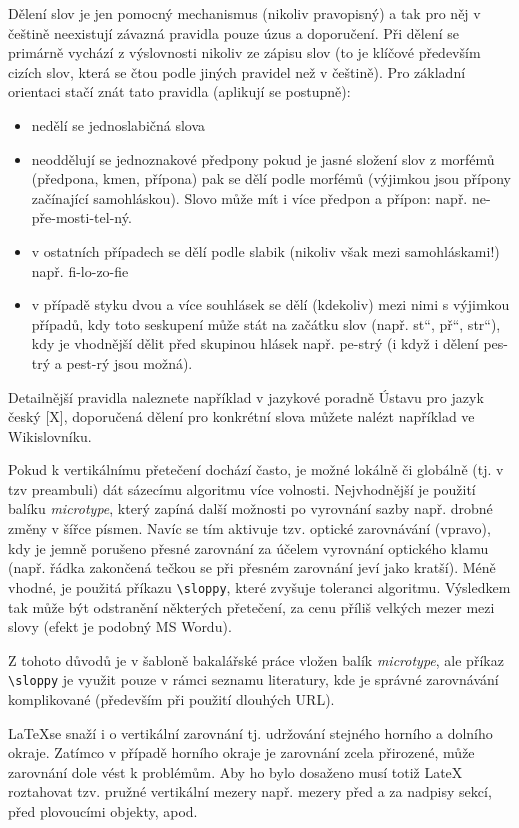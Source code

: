 \documentclass[male,czech,api_bc]{kitheses}
\newcommand{\UV}[1]{\quotedblbase#1\textquotedblleft}
\begin{document}
Dělení slov je jen pomocný mechanismus (nikoliv pravopisný) a tak pro něj v češtině neexistují závazná pravidla pouze úzus a doporučení. Při dělení se primárně vychází z výslovnosti nikoliv ze zápisu slov (to je klíčové především cizích slov, která se čtou podle jiných pravidel než v češtině). Pro základní orientaci stačí znát tato pravidla (aplikují se postupně):

\begin{itemize}
\item nedělí se jednoslabičná slova
\item neoddělují se jednoznakové předpony
pokud je jasné složení slov z morfémů (předpona, kmen, přípona) pak se dělí podle morfémů (výjimkou jsou přípony začínající samohláskou). Slovo může mít i více předpon a přípon: např. ne-pře-mosti-tel-ný.
\item v ostatních případech se dělí podle slabik (nikoliv však mezi samohláskami!) např. fi-lo-zo-fie
\item v případě styku dvou a více souhlásek se dělí (kdekoliv) mezi nimi s výjimkou případů, kdy toto seskupení může stát na začátku slov (např. \UV{st}, \UV{př}, \UV{str}), kdy je vhodnější dělit před skupinou hlásek např. pe-strý (i když i dělení pes-trý a pest-rý jsou možná).
\end{itemize}

Detailnější pravidla naleznete například v jazykové poradně Ústavu pro jazyk český [X], doporučená dělení pro konkrétní slova můžete nalézt například ve Wikislovníku.

Pokud k vertikálnímu přetečení dochází často, je možné lokálně či globálně (tj. v tzv preambuli) dát sázecímu algoritmu více volnosti. Nejvhodnější je použití balíku \textit{microtype}, který zapíná další možnosti po vyrovnání sazby např. drobné změny v šířce písmen. Navíc se tím aktivuje tzv. optické zarovnávání (vpravo), kdy je jemně porušeno přesné zarovnání za účelem vyrovnání optického klamu (např. řádka zakončená tečkou se při přesném zarovnání jeví jako kratší). Méně vhodné, je použitá příkazu \verb!\sloppy!, které zvyšuje toleranci algoritmu. Výsledkem tak může být odstranění některých přetečení, za cenu příliš velkých mezer mezi slovy (efekt je podobný MS Wordu).

Z tohoto důvodů je v šabloně bakalářské práce vložen balík  \textit{microtype}, ale příkaz \verb!\sloppy! je využit pouze v rámci seznamu literatury, kde je správné zarovnávání komplikované (především při použití dlouhých URL).

\LaTeX se snaží i o vertikální zarovnání tj. udržování stejného horního a dolního okraje. Zatímco v případě horního okraje je zarovnání zcela přirozené, může zarovnání dole vést k problémům. Aby ho bylo dosaženo musí totiž LateX roztahovat tzv. pružné vertikální mezery např. mezery před a za nadpisy sekcí, před plovoucími objekty, apod.
\end{document}
